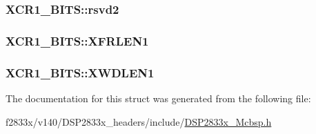 \subsubsection[{rsvd2}]{ X\+C\+R1\+\_\+\+B\+I\+T\+S\+::rsvd2}\label{struct_x_c_r1___b_i_t_s_ae8daa7b16dcbf6ecbc431b8a6e3fe0d1}
\hypertarget{struct_x_c_r1___b_i_t_s_aa9d637408835737deda4a18ce456e2ed}{}
\subsubsection[{X\+F\+R\+L\+E\+N1}]{ X\+C\+R1\+\_\+\+B\+I\+T\+S\+::\+X\+F\+R\+L\+E\+N1}\label{struct_x_c_r1___b_i_t_s_aa9d637408835737deda4a18ce456e2ed}
\hypertarget{struct_x_c_r1___b_i_t_s_ac40b01a0a0f2c84ebc86e4bd77c8aaa3}{}
\subsubsection[{X\+W\+D\+L\+E\+N1}]{ X\+C\+R1\+\_\+\+B\+I\+T\+S\+::\+X\+W\+D\+L\+E\+N1}\label{struct_x_c_r1___b_i_t_s_ac40b01a0a0f2c84ebc86e4bd77c8aaa3}


The documentation for this struct was generated from the following file\+:\begin{DoxyCompactItemize}
\item 
f2833x/v140/\+D\+S\+P2833x\+\_\+headers/include/\hyperlink{_d_s_p2833x___mcbsp_8h}{D\+S\+P2833x\+\_\+\+Mcbsp.\+h}\end{DoxyCompactItemize}
